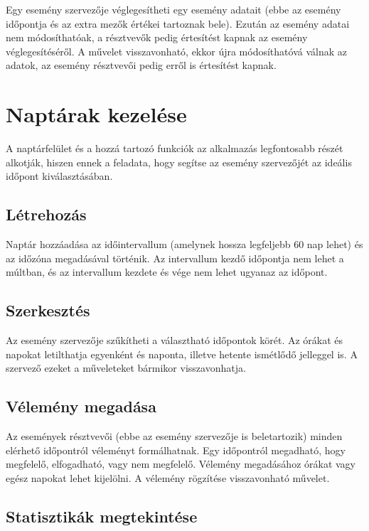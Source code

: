 \documentclass[a4paper,12pt]{report}
\theoremstyle{definition}
\theoremstyle{remark}
\begin{document}
Egy esemény szervezője véglegesítheti egy esemény adatait (ebbe az esemény időpontja és az extra mezők értékei tartoznak bele).  Ezután az esemény adatai nem módosíthatóak, a résztvevők pedig értesítést kapnak az esemény véglegesítéséről. A művelet visszavonható, ekkor újra módosíthatóvá válnak az adatok, az esemény résztvevői pedig erről is értesítést kapnak.

\section{Naptárak kezelése}

A naptárfelület és a hozzá tartozó funkciók az alkalmazás legfontosabb részét alkotják, hiszen ennek a feladata, hogy segítse az esemény szervezőjét az ideális időpont kiválasztásában.

	\subsection{Létrehozás}

Naptár hozzáadása az időintervallum (amelynek hossza legfeljebb 60 nap lehet) és az időzóna megadásával történik. Az intervallum kezdő időpontja nem lehet a múltban, és az intervallum kezdete és vége nem lehet ugyanaz az időpont.

	\subsection{Szerkesztés}

Az esemény szervezője szűkítheti a választható időpontok körét. Az órákat és napokat letilthatja egyenként és naponta, illetve hetente ismétlődő jelleggel is. A szervező ezeket a műveleteket bármikor visszavonhatja.

	\subsection{Vélemény megadása}

Az események résztvevői (ebbe az esemény szervezője is beletartozik) minden elérhető időpontról véleményt formálhatnak. Egy időpontról megadható, hogy megfelelő, elfogadható, vagy nem megfelelő. Vélemény megadásához órákat vagy egész napokat lehet kijelölni. A vélemény rögzítése visszavonható művelet.

	\subsection{Statisztikák megtekintése}
\end{document}
